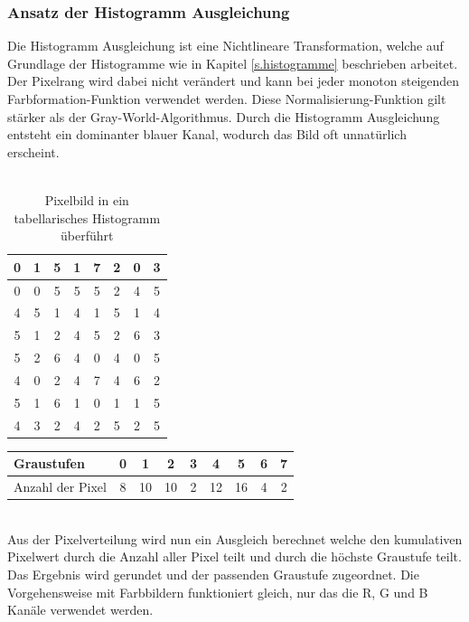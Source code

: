 \documentclass[a4paper,12pt,oneside]{article}
\begin{document}
  \subsubsection{Ansatz der Histogramm Ausgleichung}\label{s.ha}
  Die Histogramm Ausgleichung ist eine Nichtlineare Transformation, welche auf Grundlage der Histogramme wie in Kapitel \ref{s.histogramme} beschrieben arbeitet. Der Pixelrang wird dabei nicht verändert und kann bei jeder monoton steigenden Farbformation-Funktion verwendet werden. Diese Normalisierung-Funktion gilt stärker als der Gray-World-Algorithmus. Durch die Histogramm Ausgleichung entsteht ein dominanter blauer Kanal, wodurch das Bild oft unnatürlich erscheint.\\\\
   \begin{table}
  [h]
  \centering
  \caption{Pixelbild in ein tabellarisches Histogramm überführt}
  \begin{tabular}{|c|c|c|c|c|c|c|c|}
  \hline
  0&1&5&1&7&2&0&3\\
  \hline
  0&0&5&5&5&2&4&5\\
  \hline
  4&5&1&4&1&5&1&4\\
  \hline
  5&1&2&4&5&2&6&3\\
  \hline
  5&2&6&4&0&4&0&5\\
  \hline
  4&0&2&4&7&4&6&2\\
  \hline
  5&1&6&1&0&1&1&5\\
  \hline
  4&3&2&4&2&5&2&5\\
  \hline
  \end{tabular}
  \end{table}
  \begin{table}
  [h]
  \centering
  \begin{tabular}{|l|c|c|c|c|c|c|c|c|}
  \hline
  Graustufen & 0 & 1 & 2 & 3 & 4 & 5 & 6 & 7\\
  \hline
  Anzahl der Pixel & 8 & 10 & 10 & 2 & 12 & 16 & 4 & 2\\
  \hline
  \end{tabular}
  \end{table}\\
Aus der Pixelverteilung wird nun ein Ausgleich berechnet welche den kumulativen Pixelwert durch die Anzahl aller Pixel teilt und durch die höchste Graustufe teilt. Das Ergebnis wird gerundet und der passenden Graustufe zugeordnet. Die Vorgehensweise mit Farbbildern funktioniert gleich, nur das die R, G und B Kanäle verwendet werden.
\end{document}
